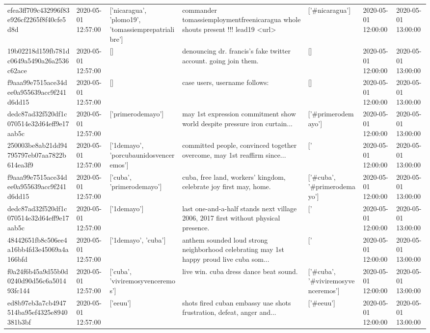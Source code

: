 \begin{tabular}{lllllll}
efea3ff709c432996f83e926cf2265f8f40cfe5d8d & 2020-05-01 12:57:00 & ['nicaragua', 'plomo19', 'tomassiemprepatrialibre'] & commander tomassiemploymentfreenicaragua whole shouts present !!! lead19 <url> & ['#nicaragua'] & 2020-05-01 12:00:00 & 2020-05-01 13:00:00 \\
19b02218d159fb781dc0649a5490a26a2536c62ace & 2020-05-01 12:57:00 & [] & denouncing dr. francis's fake twitter account. going join them. & [] & 2020-05-01 12:00:00 & 2020-05-01 13:00:00 \\
f9aaa99e7515ace34dee0a955639acc9f241d6dd15 & 2020-05-01 12:57:00 & [] & case users, username follows: & [] & 2020-05-01 12:00:00 & 2020-05-01 13:00:00 \\
dedc87ad32f520df1c070514e32d64eff9e17aab5c & 2020-05-01 12:57:00 & ['primerodemayo'] & may 1st expression commitment show world despite pressure iron curtain... & ['#primerodemayo'] & 2020-05-01 12:00:00 & 2020-05-01 13:00:00 \\
250003be8ab21dd94795797eb07aa7822b614ea3f9 & 2020-05-01 12:57:00 & ['1demayo', 'porcubaunidosvenceremos'] & committed people, convinced together overcome, may 1st reaffirm since... & ['#1demayo', '#porcubaunidosvenceremos'] & 2020-05-01 12:00:00 & 2020-05-01 13:00:00 \\
f9aaa99e7515ace34dee0a955639acc9f241d6dd15 & 2020-05-01 12:57:00 & ['cuba', 'primerodemayo'] & cuba, free land, workers' kingdom, celebrate joy first may, home. & ['#cuba', '#primerodemayo'] & 2020-05-01 12:00:00 & 2020-05-01 13:00:00 \\
dedc87ad32f520df1c070514e32d64eff9e17aab5c & 2020-05-01 12:57:00 & ['1demayo'] & last one-and-a-half stands next village 2006, 2017 first without physical presence. & ['#1demayo'] & 2020-05-01 12:00:00 & 2020-05-01 13:00:00 \\
48442651fb8c506ee4a16bb4fd3e45069a4a166bfd & 2020-05-01 12:57:00 & ['1demayo', 'cuba'] & anthem sounded loud strong neighborhood celebrating may 1st happy proud live cuba som... & ['#1demayo', '#cuba'] & 2020-05-01 12:00:00 & 2020-05-01 13:00:00 \\
f0a24f6b45a9d55b0d0240d90d56c6a501493fc144 & 2020-05-01 12:57:00 & ['cuba', 'viviremosyvenceremos'] & live win. cuba dress dance beat sound. & ['#cuba', '#viviremosyvenceremos'] & 2020-05-01 12:00:00 & 2020-05-01 13:00:00 \\
ed8b97eb3a7cb4947514ba95ef4325e8940381b3bf & 2020-05-01 12:57:00 & ['eeuu'] & shots fired cuban embassy uae shots frustration, defeat, anger and... & ['#eeuu'] & 2020-05-01 12:00:00 & 2020-05-01 13:00:00 \\

\end{tabular}
